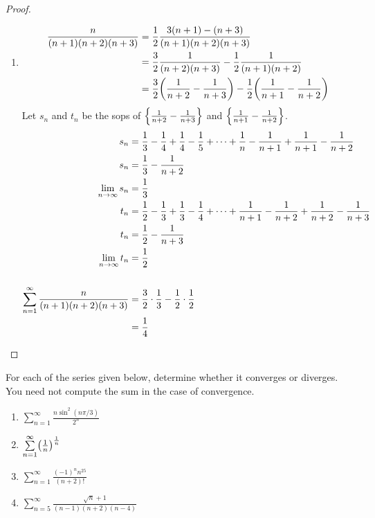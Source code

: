 \documentclass[12pt]{article}
\begin{document}
\begin{proof}
\begin{enumerate}[label=(\alph*)]
        \item
        \begin{align*}
            \frac{n}{(n + 1)(n + 2)(n + 3)} &= \frac{1}{2}\frac{3(n + 1) - (n + 3)}{(n + 1)(n + 2)(n + 3)} \\
            &= \frac{3}{2} \frac{1}{(n + 2)(n + 3)} - \frac{1}{2} \frac{1}{(n + 1)(n + 2)}\\
            &= \frac{3}{2} \paren{\frac{1}{n + 2} - \frac{1}{n + 3}} - \frac{1}{2} \paren{\frac{1}{n + 1} - \frac{1}{n + 2}}
        \end{align*}
        Let $s_{n}$ and $t_{n}$ be the sops of $\set{\frac{1}{n+2} - \frac{1}{n+3}}$ and $\set{\frac{1}{n+1} - \frac{1}{n+2}}$.
        \begin{align*}
            s_{n} &= \frac{1}{3} - \frac{1}{4} + \frac{1}{4} - \frac{1}{5} + \dots + \frac{1}{n} - \frac{1}{n+1} + \frac{1}{n+1} - \frac{1}{n+2} \\
            s_{n} &= \frac{1}{3} - \frac{1}{n+2} \\
            \lim_{n \to \infty} s_{n} &= \frac{1}{3} \\
            t_{n} &= \frac{1}{2} - \frac{1}{3} + \frac{1}{3} -\frac{1}{4} + \dots + \frac{1}{n + 1} - \frac{1}{n + 2} + \frac{1}{n + 2} - \frac{1}{n + 3}\\
            t_{n} &= \frac{1}{2} - \frac{1}{n + 3} \\
            \lim_{n \to \infty} t_{n} &= \frac{1}{2} \\
            \\
            \sum_{n=1}^{\infty} \frac{n}{(n + 1)(n + 2)(n + 3)} &= \frac{3}{2} \cdot \frac{1}{3} - \frac{1}{2} \cdot \frac{1}{2} \\
            &= \frac{1}{4} \qedhere
        \end{align*}
    \end{enumerate}
\end{proof}

\begin{problem}
    For each of the series given below, determine whether it converges or diverges.
    You need not compute the sum in the case of convergence.
    \begin{enumerate}[label=(\arabic*)]
        \item $\sum\limits_{n=1}^{\infty} \frac{n \sin^{2}(n\pi/3)}{2^{n}}$
        \item $\sum\limits_{n=1}^{\infty} \paren{\frac{1}{n}}^{\frac{1}{n}}$
        \item $\sum\limits_{n=1}^{\infty} \frac{(-1)^{n}n^{25}}{(n+2)!}$
        \item $\sum\limits_{n=5}^{\infty} \frac{\sqrt{n}+1}{(n-1)(n+2)(n-4)}$
    \end{enumerate}
\end{problem}
\end{document}
